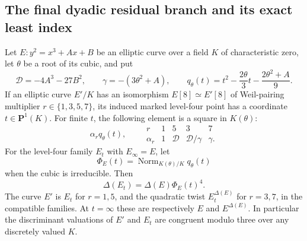\subsection{The final dyadic residual branch and its exact least index}

\begin{lemma}
\label{lem:B-RD48-models}
Let $E:y^2=x^3+A x+B$ be an elliptic curve over a field $K$ of
characteristic zero, let $\theta$ be a root of its cubic, and put
\[
 \mathcal D=-4A^3-27B^2,\qquad
 \gamma=-(3\theta^2+A),\qquad
 q_\theta(t)=t^2-\frac{2\theta}{3}t-
                         \frac{2\theta^2+A}{9}.          \tag{B-RD48.1}
\]
If an elliptic curve $E'/K$ has an isomorphism $E[8]\simeq E'[8]$
of Weil-pairing multiplier $r\in\{1,3,5,7\}$, its induced
marked level-four point has a coordinate $t\in\mathbf P^1(K)$.
For finite $t$, the following element is a square in $K(\theta)$:
\[
 \alpha_r q_\theta(t),\qquad
 \begin{array}{c|rrrr}
 r&1&5&3&7\\\hline
 \alpha_r&1&\mathcal D&\mathcal D/\gamma&\gamma.
 \end{array}                                             \tag{B-RD48.2}
\]
For the level-four family $E_t$ with $E_\infty=E$, let
\[
 \Phi_E(t)=\operatorname{Norm}_{K(\theta)/K}q_\theta(t)
                                                               \tag{B-RD48.3}
\]
when the cubic is irreducible. Then
\[
                  \Delta(E_t)=\Delta(E)\Phi_E(t)^4.      \tag{B-RD48.4}
\]
The curve $E'$ is $E_t$ for $r=1,5$, and the quadratic twist
$E_t^{\Delta(E)}$ for $r=3,7$, in the compatible families.
At $t=\infty$ these are respectively $E$ and $E^{\Delta(E)}$.
In particular the discriminant valuations of $E'$ and $E_t$
are congruent modulo three over any discretely valued $K$.
\end{lemma}
